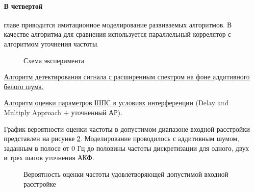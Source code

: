 \paragraph{В четвертой} главе приводится имитационное моделирование развиваемых алгоритмов. В качестве алгоритма
для сравнения используется параллельный коррелятор с алгоритмом уточнения частоты.

\begin{figure}[H]
\center{}
	\caption{Схема эксперимента}
	\label{pic:ar_dma_probability}
\end{figure}

\underline{Алгоритм детектирования сигнала с расширенным спектром на фоне аддитивного белого шума.}

\underline{Алгоритм оценки параметров ШПС в условиях интерференции} (Delay and Multiply Approach + уточненный АР).

График вероятности оценки частоты в допустимом диапазоне входной расстройки представлен на рисунке
\ref{pic:ar_dma_probability}. Моделирование проводилось с аддитивным шумом, заданным в полосе от 0 Гц до
половины частоты дискретизации для одного, двух и трех шагов уточнения АКФ.
\begin{figure}[H]
\center{}
	\caption{Вероятность оценки частоты удовлетворяющей допустимой входной расстройке}
	\label{pic:ar_dma_probability}
\end{figure}


